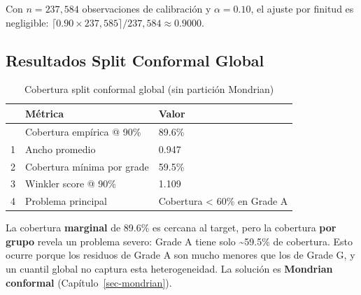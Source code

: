 \documentclass[
  spanish,
  11pt,
  letterpaper,
]{scrbook}
\theoremstyle{plain}
\theoremstyle{remark}
\begin{document}
Con \(n = 237{,}584\) observaciones de calibración y \(\alpha = 0.10\),
el ajuste por finitud es negligible:
\(\lceil 0.90 \times 237{,}585 \rceil / 237{,}584 \approx 0.9000\).

\subsection{Resultados Split Conformal
Global}\label{resultados-split-conformal-global}

{

\begin{longtable}[]{@{}lll@{}}

\caption{\label{tbl-split-global-results}Cobertura split conformal
global (sin partición Mondrian)}

\tabularnewline

\toprule\noalign{}
& Métrica & Valor \\
\midrule\noalign{}
\endhead
\bottomrule\noalign{}
\endlastfoot
0 & Cobertura empírica @ 90\% & 89.6\% \\
1 & Ancho promedio & 0.947 \\
2 & Cobertura mínima por grade & 59.5\% \\
3 & Winkler score @ 90\% & 1.109 \\
4 & Problema principal & Cobertura \textless{} 60\% en Grade A \\

\end{longtable}

}

\begin{tcolorbox}[enhanced jigsaw, arc=.35mm, bottomrule=.15mm, bottomtitle=1mm, breakable, colback=white, colbacktitle=quarto-callout-warning-color!10!white, colframe=quarto-callout-warning-color-frame, coltitle=black, left=2mm, leftrule=.75mm, opacityback=0, opacitybacktitle=0.6, rightrule=.15mm, title=\textcolor{quarto-callout-warning-color}{\faExclamationTriangle}\hspace{0.5em}{Limitación del Split Conformal Global}, titlerule=0mm, toprule=.15mm, toptitle=1mm]

La cobertura \textbf{marginal} de 89.6\% es cercana al target, pero la
cobertura \textbf{por grupo} revela un problema severo: Grade A tiene
solo \textasciitilde59.5\% de cobertura. Esto ocurre porque los residuos
de Grade A son mucho menores que los de Grade G, y un cuantil global no
captura esta heterogeneidad. La solución es \textbf{Mondrian conformal}
(Capítulo~\ref{sec-mondrian}).

\end{tcolorbox}
\end{document}
